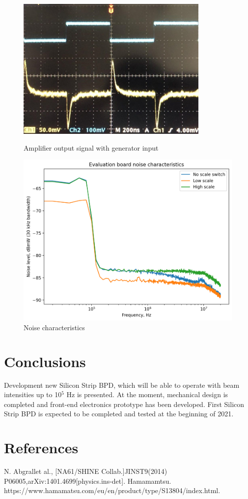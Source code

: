 \documentclass[a4paper]{jpconf}
\begin{document}
\begin{figure}[htbp]
	\begin{minipage}{20pc}
		\includegraphics[width=\textwidth]{osc.png}
		\caption{\label{fig:9} Amplifier output signal with generator input}
	\end{minipage}\hspace{2pc}
	\begin{minipage}{20pc}
		\includegraphics[width=\textwidth]{noise.png}
		\caption{\label{fig:10} Noise characteristics}
	\end{minipage} 
\end{figure}
\section{Conclusions}
Development new Silicon Strip BPD, which will be able to operate with beam intensities up to 10$^5$ Hz is presented. At the moment, mechanical design is completed and front-end electronics prototype has been developed. First Silicon Strip BPD is expected to be completed and tested at the beginning of 2021.

\section*{References}
\begin{thebibliography}{9}
	 N. Abgrallet al., [NA61/SHINE Collab.]JINST9(2014) P06005,arXiv:1401.4699[physics.ins-det].
	Hamamamtsu. https://www.hamamatsu.com/eu/en/product/type/S13804/index.html.
\end{thebibliography}
\end{document}
